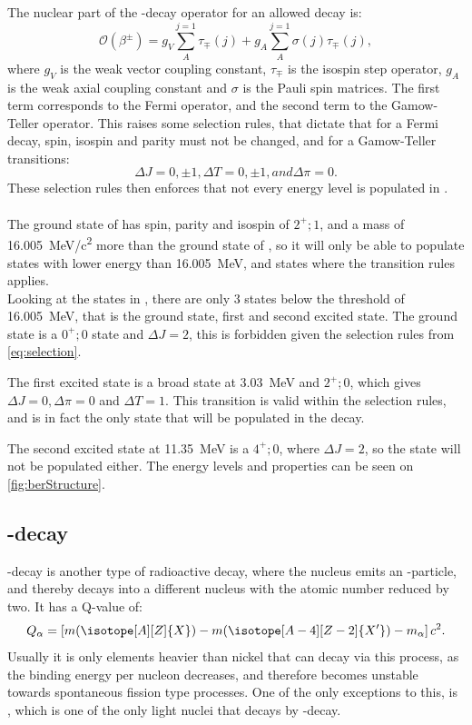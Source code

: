 The nuclear part of the \be-decay operator for an allowed decay is:
\begin{equation}
	\mathcal{O} (\beta^\pm) = g_V \sum_{A}^{j=1}\tau_\mp (j) + g_A \sum_{A}^{j=1}\sigma(j)\tau_\mp(j),
\end{equation}
where $g_V$ is the weak vector coupling constant, $\tau_\mp$ is the isospin step operator, $g_A$ is the weak axial coupling constant and $\sigma$ is the Pauli spin matrices.
The first term corresponds to the Fermi operator, and the second term to the Gamow-Teller operator. 
This raises some selection rules, that dictate that for a Fermi decay, spin, isospin and parity must not be changed, and for a Gamow-Teller transitions:
\begin{equation}
\Delta J = 0, \pm1, \Delta T = 0, \pm 1, and \Delta \pi = 0.
\label{eq:selection}
\end{equation}
These selection rules \cite{doi:https://doi.org/10.1002/9783527693610.ch24} then enforces that not every energy level is populated in \ber. 
\\
\\
The ground state of \li has spin, parity and isospin of $2^+; 1$, and a mass of \SI{16.005}{MeV/c^2} more than the ground state of \ber, so it will only be able to populate states with lower energy than \SI{16.005}{MeV}, and states where the transition rules applies.\\
Looking at the states in \ber, there are only 3 states below the threshold of \SI{16.005}{MeV}, that is the ground state, first and second excited state. 
The ground state is a $0^+; 0$ state and $\Delta J = 2$, this is forbidden given the selection rules from \cref{eq:selection}. 

The first excited state is a broad state at \SI{3.03}{MeV} and $2^+; 0$, which gives $\Delta J = 0, \Delta \pi = 0$ and $\Delta T = 1$. This transition is valid within the selection rules, and is in fact the only state that will be populated in the decay.

The second excited state at \SI{11.35}{MeV} is a  $4^+; 0$, where $\Delta J = 2$, so the state will not be populated either.
The energy levels and properties can be seen on \cref{fig:berStructure}.
\subsection{\al-decay}
\al-decay is another type of radioactive decay, where the nucleus emits an \al-particle, and thereby decays into a different nucleus with the atomic number reduced by two.  
It has a Q-value of:
\begin{equation}
Q_\alpha =  \left[ m (\isotope[A][Z]{X}) - m(\isotope[A-4][Z-2]{X'})  	- m_\alpha	 \right] c^2.
\end{equation}
Usually it is only elements heavier than nickel that can decay via this process, as the binding energy per nucleon decreases, and therefore becomes unstable towards spontaneous fission type processes. 
One of the only exceptions to this, is \ber, which is one of the only light nuclei that decays by \al-decay.

